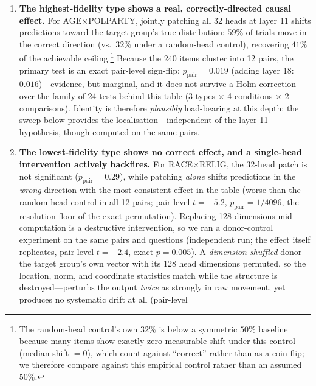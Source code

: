 \begin{enumerate}
  \item \textbf{The highest-fidelity type shows a real, correctly-directed
        causal effect.} For AGE$\times$POLPARTY, jointly patching all 32
        heads at layer 11 shifts predictions toward the target group's
        true distribution: $59\%$ of trials move in the correct direction
        (vs.\ $32\%$ under a random-head control), recovering $41\%$ of
        the achievable ceiling.\footnote{The random-head control's own
        $32\%$ is below a symmetric $50\%$ baseline because many items
        show exactly zero measurable shift under this control (median
        shift $=0$), which count against ``correct'' rather than as a
        coin flip; we therefore compare against this empirical control
        rather than an assumed $50\%$.} Because the 240 items cluster into 12
        pairs, the primary test is an exact pair-level sign-flip:
        $p_{\text{pair}}=0.019$ (adding layer 18: $0.016$)---evidence,
        but marginal, and it does not survive a Holm correction over the
        family of 24 tests behind this table (3 types $\times$ 4
        conditions $\times$ 2 comparisons). Identity is therefore
        \emph{plausibly} load-bearing at this depth; the sweep below
        provides the localisation---independent of the layer-11
        hypothesis, though computed on the same pairs.
  \item \textbf{The lowest-fidelity type shows no correct effect, and a
        single-head intervention actively backfires.} For
        RACE$\times$RELIG, the 32-head patch is not significant
        ($p_{\text{pair}}=0.29$), while patching \starhead{} \emph{alone}
        shifts predictions in the \emph{wrong} direction with the most
        consistent effect in the table (worse than the random-head
        control in all 12 pairs; pair-level $t=-5.2$,
        $p_{\text{pair}}=1/4096$, the resolution floor of the exact
        permutation). Replacing
        128 dimensions mid-computation is a destructive intervention, so
        we ran a donor-control experiment on the same pairs and questions
        (independent run; the effect itself replicates, pair-level
        $t=-2.4$, exact $p=0.005$).
        A \emph{dimension-shuffled} donor---the target group's own
        vector with its 128 head dimensions permuted, so the location,
        norm, and coordinate statistics match while the structure is
        destroyed---perturbs the output \emph{twice} as strongly in raw
        movement, yet produces no systematic drift at all (pair-level

\end{enumerate}

